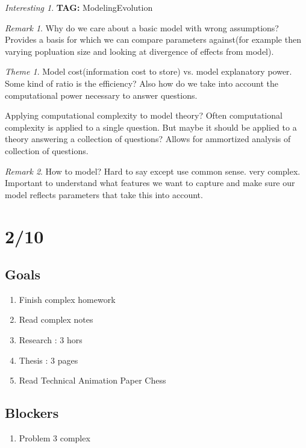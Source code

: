 \documentclass[11pt]{article}
\theoremstyle{remark}
\newtheorem{remark}{Remark}
\newtheorem{interest}{Interesting}
\newtheorem{theme}{Theme}
\begin{document}
\begin{interest}
\textbf{TAG:} ModelingEvolution

\begin{remark}
	Why do we care about a basic model with wrong assumptions? Provides a basis for which we can compare parameters against(for example then varying popluation size and looking at divergence of effects from model).
\end{remark}

\begin{theme}
	Model cost(information cost to store) vs. model explanatory power. Some kind of ratio is the efficiency? Also how do we take into account the computational power necessary to answer questions.

	Applying computational complexity to model theory? Often computational complexity is applied to a single question. But maybe it should be applied to a theory answering a collection of questions? Allows for ammortized analysis of collection of questions.
\end{theme}

\begin{remark}
	How to model? Hard to say except use common sense. very complex. Important to understand what features we want to capture and make sure our model reflects parameters that take this into account.
\end{remark}

\section{2/10}

\subsection{Goals}

\begin{enumerate}
	\item Finish complex homework
	\item Read complex notes	
	\item Research : 3 hors
	\item Thesis : 3 pages
	\item Read Technical Animation Paper
	 Chess
\end{enumerate}

\subsection{Blockers}

\begin{enumerate}
	\item Problem 3 complex
\end{enumerate}
	

\end{interest}
\end{document}
